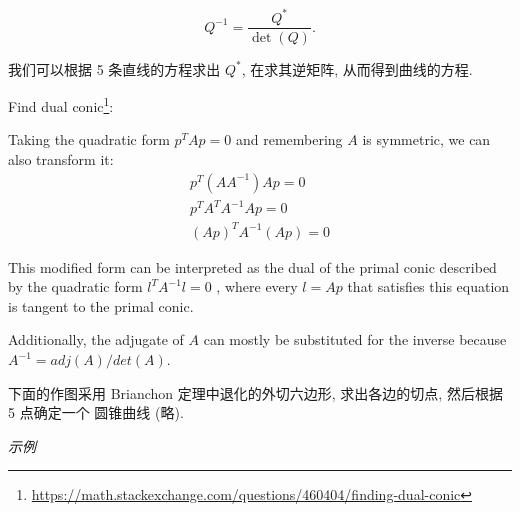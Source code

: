 \[
  Q^{-1} = \dfrac{Q^*}{\det(Q)}.
\]

我们可以根据 5 条直线的方程求出 $Q^*$, 在求其逆矩阵, 从而得到曲线的方程.

Find dual conic\footnote{\url{https://math.stackexchange.com/questions/460404/finding-dual-conic}}:

Taking the quadratic form $p^TAp=0$ and remembering $A$ 
is symmetric, we can also transform it:
\begin{gather*}
  p^T(AA^{-1})Ap=0 \\
  p^TA^TA^{-1}Ap=0 \\
  (Ap)^TA^{-1}(Ap)=0 
\end{gather*}

This modified form can be interpreted as the dual of the primal conic described by the quadratic form $l^𝑇𝐴^{−1}l=0$
, where every $l=Ap$ that satisfies this equation is tangent to the primal conic.

Additionally, the adjugate of $A$ can mostly be substituted for the inverse because $A^{-1}=adj(A)/det(A)$.

下面的作图采用 Brianchon 定理中退化的外切六边形, 求出各边的切点, 然后根据 5 点确定一个
圆锥曲线 (略).

\emph{示例}



